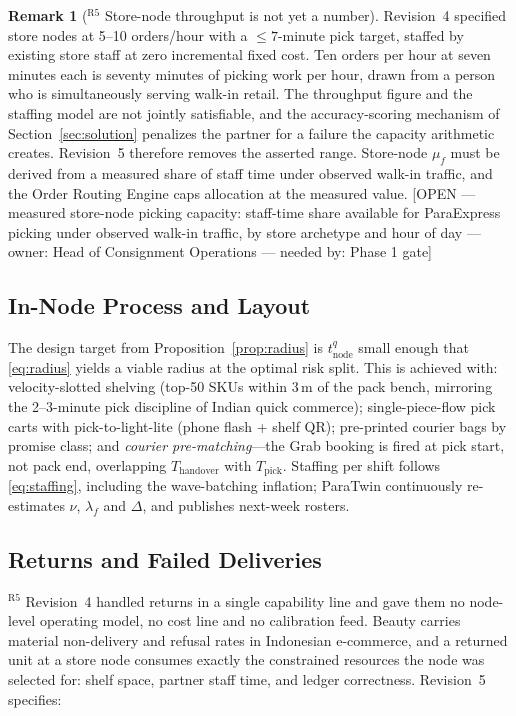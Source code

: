 \documentclass[10pt,twocolumn,letterpaper]{article}
\theoremstyle{definition}
\newtheorem{remark}{Remark}
\newcommand{\OPEN}[3]{{\color{openred}\footnotesize\textsf{[OPEN --- #1 --- owner: #2 --- needed by: #3]}}}
\begin{document}
\begin{remark}[$^{\mathrm{R5}}$ Store-node throughput is not yet a number]
Revision~4 specified store nodes at 5--10 orders/hour with a $\le7$-minute pick target, staffed by existing store staff at zero incremental fixed cost. Ten orders per hour at seven minutes each is seventy minutes of picking work per hour, drawn from a person who is simultaneously serving walk-in retail. The throughput figure and the staffing model are not jointly satisfiable, and the accuracy-scoring mechanism of Section~\ref{sec:solution} penalizes the partner for a failure the capacity arithmetic creates. Revision~5 therefore removes the asserted range. Store-node $\mu_f$ must be derived from a measured share of staff time under observed walk-in traffic, and the Order Routing Engine caps allocation at the measured value. \OPEN{measured store-node picking capacity: staff-time share available for ParaExpress picking under observed walk-in traffic, by store archetype and hour of day}{Head of Consignment Operations}{Phase 1 gate}
\end{remark}

\subsection{In-Node Process and Layout}
The design target from Proposition~\ref{prop:radius} is $t^{q}_{\mathrm{node}}$ small enough that \eqref{eq:radius} yields a viable radius at the optimal risk split. This is achieved with: velocity-slotted shelving (top-50 SKUs within 3\,m of the pack bench, mirroring the 2--3-minute pick discipline of Indian quick commerce); single-piece-flow pick carts with pick-to-light-lite (phone flash + shelf QR); pre-printed courier bags by promise class; and \emph{courier pre-matching}---the Grab booking is fired at pick start, not pack end, overlapping $T_{\mathrm{handover}}$ with $T_{\mathrm{pick}}$. Staffing per shift follows \eqref{eq:staffing}, including the wave-batching inflation; ParaTwin continuously re-estimates $\nu$, $\lambda_f$ and $\Delta$, and publishes next-week rosters.

\subsection{Returns and Failed Deliveries}\label{sec:returns}
$^{\mathrm{R5}}$ Revision~4 handled returns in a single capability line and gave them no node-level operating model, no cost line and no calibration feed. Beauty carries material non-delivery and refusal rates in Indonesian e-commerce, and a returned unit at a store node consumes exactly the constrained resources the node was selected for: shelf space, partner staff time, and ledger correctness. Revision~5 specifies:
\end{document}
